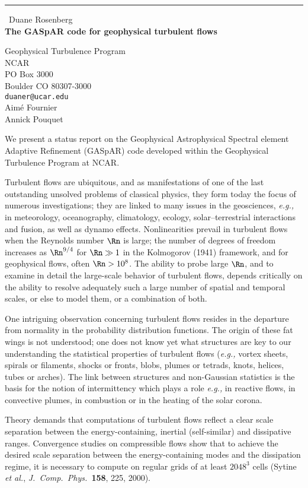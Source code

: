 \documentclass{report}
\begin{document}
\begin{center}
\rule{6in}{1pt} \
{\large Duane Rosenberg \\
{\bf The GASpAR code for geophysical turbulent flows}}

Geophysical Turbulence Program \\ NCAR \\ PO Box 3000 \\ Boulder CO 80307-3000
\\
{\tt duaner@ucar.edu}\\
Aim\'e Fournier\\
Annick Pouquet\end{center}

We present a status report on the Geophysical Astrophysical Spectral element
Adaptive Refinement (GASpAR) code developed within the Geophysical
Turbulence Program at NCAR.

Turbulent flows are ubiquitous, and as manifestations of one of the
last outstanding unsolved problems of classical physics, they form
today the focus of numerous investigations; they
are linked to many issues in the geosciences, {\it e.g.,} in meteorology,
oceanography, climatology, ecology, solar--terrestrial interactions
and fusion, as well as dynamo effects.
Nonlinearities prevail in turbulent flows when the
Reynolds number $\Rn$
is large; the number of degrees of freedom increases as
$\Rn^{9/4}$ for $\Rn\gg1$ in the Kolmogorov (1941) framework,
and for geophysical flows, often $\Rn> 10^8$.
The ability to probe large $\Rn$, and to examine in detail the
large-scale behavior of turbulent flows, depends
critically on the ability to resolve adequately such a large number of
spatial and temporal scales, or else to model them, or a combination of both.

One intriguing observation concerning turbulent flows
resides in the
departure from normality in the probability distribution
functions.
The origin of these fat wings is not understood;
one does not know yet what structures are key to our
understanding the statistical properties of turbulent flows ({\it e.g.,}
vortex sheets, spirals or filaments,
shocks or fronts, blobs, plumes or tetrads, knots, helices, tubes or
arches).
The link between structures and non-Gaussian statistics is the basis
for the notion of intermittency which plays a role {\it e.g.,} in
reactive flows, in convective plumes, in combustion or in the heating of
the solar corona.

Theory demands that computations of turbulent flows
reflect a clear scale separation between the energy-containing,
inertial (self-similar) and dissipative ranges.
Convergence
studies on compressible flows show that to achieve the desired
scale separation between the
energy-containing modes and the dissipation regime, it is necessary to
compute on regular grids of at least $2048^3$ cells (Sytine {\it et
al.}, {\it J.\ Comp.\ Phys.\ }{\bf 158}, 225, 2000).
\end{document}
